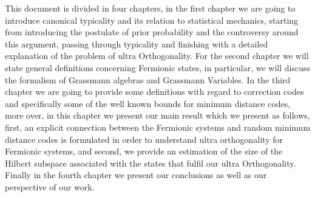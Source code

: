 \indent This document is divided in four chapters, in the first chapter we are going to introduce canonical typicality and its relation to statistical mechanics, starting from introducing the postulate of prior probability and the controversy around this argument, passing through typicality and finishing with a detailed explanation of the problem of ultra Orthogonality. For the second chapter we will state general definitions concerning Fermionic states, in particular, we will discuss the formalism of Grassmann algebras and Grassmann Variables. In the third chapter we are going to provide some definitions with regard to correction codes and specifically some of the well known bounds for minimum distance codes, more over, in this chapter we present our main result which we present as follows, first, an explicit connection between the Fermionic systems and random minimum distance codes is formulated in order to understand ultra orthogonality for Fermionic systems, and second, we provide an estimation of the size of the Hilbert subspace associated with the states that fulfil our ultra Orthogonality. Finally in  the fourth chapter we present our conclusions as well as our perspective of our work.


